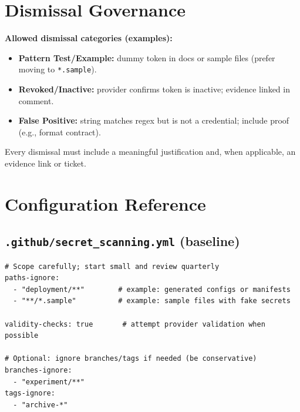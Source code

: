 \documentclass[11pt,a4paper,oneside,notitlepage]{article}
\begin{document}
\section{Dismissal Governance}\label{sec:dismissal}
\begin{tcolorbox}
\textbf{Allowed dismissal categories (examples):}
\begin{itemize}
  \item \textbf{Pattern Test/Example:} dummy token in docs or sample files (prefer moving to \texttt{*.sample}).
  \item \textbf{Revoked/Inactive:} provider confirms token is inactive; evidence linked in comment.
  \item \textbf{False Positive:} string matches regex but is not a credential; include proof (e.g., format contract).
\end{itemize}
\end{tcolorbox}
\noindent
Every dismissal must include a meaningful justification and, when applicable, an evidence link or ticket.

\section{Configuration Reference}
\subsection{\texttt{.github/secret\_scanning.yml} (baseline)}
\begin{listing}[htbp]
\caption{\texttt{.github/secret\_scanning.yml} baseline}\label{lst:secret-yaml}
\begin{verbatim}
# Scope carefully; start small and review quarterly
paths-ignore:
  - "deployment/**"        # example: generated configs or manifests
  - "**/*.sample"          # example: sample files with fake secrets

validity-checks: true       # attempt provider validation when possible

# Optional: ignore branches/tags if needed (be conservative)
branches-ignore:
  - "experiment/**"
tags-ignore:
  - "archive-*"
\end{verbatim}
\end{listing}
\end{document}
